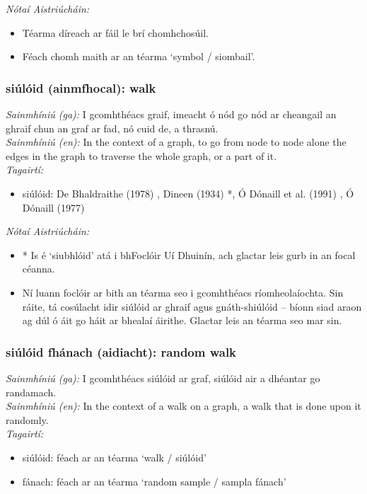 \documentclass{article}
\begin{document}
 \noindent \textit{Nótaí Aistriúcháin:}
\begin{itemize}
	\item Téarma díreach ar fáil le brí chomhchosúil.
	\item Féach chomh maith ar an téarma `symbol / siombail'.
\end{itemize}


\subsubsection*{siúlóid (ainmfhocal): walk}
 \noindent \textit{Sainmhíniú (ga):} I gcomhthéacs graif, imeacht ó nód go nód ar cheangail an ghraif chun an graf ar fad, nó cuid de, a thrasnú.
\\
 \noindent \textit{Sainmhíniú (en):} In the context of a graph, to go from node to node alone the edges in the graph to traverse the whole graph, or a part of it.
\\
 \noindent \textit{Tagairtí:}
\begin{itemize}
	\item siúlóid: De Bhaldraithe (1978) \cite{de-bhaldraithe}, Dineen (1934) \cite{dineen}*, Ó Dónaill et al. (1991) \cite{focloir-beag}, Ó Dónaill (1977) \cite{odonaill}
\end{itemize}

 \noindent \textit{Nótaí Aistriúcháin:}
\begin{itemize}
	\item * Is é `siubhlóid' atá i bhFoclóir Uí Dhuinín, ach glactar leis gurb in an focal céanna.
	\item Ní luann foclóir ar bith an téarma seo i gcomhthéacs ríomheolaíochta. Sin ráite, tá cosúlacht idir siúlóid ar ghraif agus gnáth-shiúlóid -- bíonn siad araon ag dúl ó áit go háit ar bhealaí áirithe. Glactar leis an téarma seo mar sin.
\end{itemize}


\subsubsection*{siúlóid fhánach (aidiacht): random walk}
 \noindent \textit{Sainmhíniú (ga):} I gcomhthéacs siúlóid ar graf, siúlóid air a dhéantar go randamach.
\\
 \noindent \textit{Sainmhíniú (en):} In the context of a walk on a graph, a walk that is done upon it randomly.
\\
 \noindent \textit{Tagairtí:}
\begin{itemize}
	\item siúlóid: féach ar an téarma `walk / siúlóid'
	\item fánach: féach ar an téarma `random sample / sampla fánach'
\end{itemize}
\end{document}
